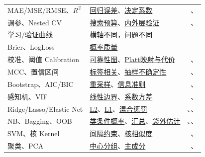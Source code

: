 \begin{xltabular}{\textwidth}{P{52mm}Y r}
MAE/MSE/RMSE、$R^2$ & \hyperref[sec:eval-regression]{回归误差}、\hyperref[sec:eval-r2]{决定系数} & \pageref{sec:eval-regression}、\pageref{sec:eval-r2}\\
调参、Nested CV & \hyperref[sec:diag-search]{搜索预算}、\hyperref[sec:diag-nested]{内外层验证} & \pageref{sec:diag-search}、\pageref{sec:diag-nested}\\
学习/验证曲线 & \hyperref[sec:diag-curves]{横轴不同，问题不同} & \pageref{sec:diag-curves}\\
Brier、LogLoss & \hyperref[sec:diag-probability]{概率质量} & \pageref{sec:diag-probability}\\
校准、阈值 Calibration & \hyperref[sec:diag-calibration]{可靠性图}、\hyperref[sec:diag-platt]{Platt映射与代价} & \pageref{sec:diag-calibration}、\pageref{sec:diag-platt}\\
MCC、置信区间 & \hyperref[sec:diag-mcc]{标签相关}、\hyperref[sec:diag-uncertainty]{抽样不确定性} & \pageref{sec:diag-mcc}、\pageref{sec:diag-uncertainty}\\
Bootstrap、AIC/BIC & \hyperref[sec:tools-bootstrap]{重采样}、\hyperref[sec:tools-aic]{信息准则} & \pageref{sec:tools-bootstrap}、\pageref{sec:tools-aic}\\
感知机、VIF & \hyperref[sec:linear-perceptron]{线性边界}、\hyperref[sec:linear-vif]{系数方差} & \pageref{sec:linear-perceptron}、\pageref{sec:linear-vif}\\
Ridge/Lasso/Elastic Net & \hyperref[sec:linear-ridge]{L2}、\hyperref[sec:linear-lasso]{L1}、\hyperref[sec:linear-elastic]{混合惩罚} & \pageref{sec:linear-ridge}、\pageref{sec:linear-lasso}、\pageref{sec:linear-elastic}\\
NB、Bagging、OOB & \hyperref[sec:tree-naive-bayes]{类条件概率}、\hyperref[sec:tree-bagging]{汇总}、\hyperref[sec:tree-oob]{袋外估计} & \pageref{sec:tree-naive-bayes}、\pageref{sec:tree-bagging}、\pageref{sec:tree-oob}\\
SVM、核 Kernel & \hyperref[sec:svm-margin]{间隔约束}、\hyperref[sec:svm-kernel]{核相似度} & \pageref{sec:svm-margin}、\pageref{sec:svm-kernel}\\
聚类、PCA & \hyperref[sec:unsup-kmeans]{中心分组}、\hyperref[sec:unsup-pca]{主成分} & \pageref{sec:unsup-kmeans}、\pageref{sec:unsup-pca}\\

\end{xltabular}
\endgroup

